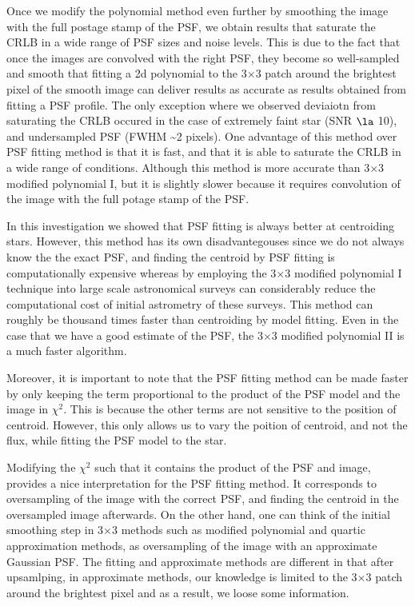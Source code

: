 \documentclass[12pt, preprint]{aastex}
\begin{document}
Once we modify the polynomial method even further by smoothing the image with the full postage stamp
of the PSF, we obtain results that saturate the CRLB in a wide range of PSF sizes and noise levels.  
This is due to the fact that once the images are convolved with the right PSF, they become so well-sampled and smooth
that fitting a 2d polynomial to the 3$\times$3 patch around the brightest pixel of the smooth image can deliver
results as accurate as results obtained from fitting a PSF profile. The only exception where we observed deviaiotn from
saturating the CRLB occured in the case of extremely faint star (SNR $\la$ 10), and undersampled PSF (FWHM \sim 2 pixels).
One advantage of this method over PSF fitting method is that it is fast, and that it is able to saturate the CRLB in 
a wide range of conditions. Although this method is more accurate than 3$\times$3 modified polynomial I, but it is
slightly slower because it requires convolution of the image with the full potage stamp of the PSF. 

In this investigation we showed that PSF fitting is always better at centroiding stars.
However, this method has its own disadvantegouses since we do not always know the the exact PSF, and 
finding the centroid by PSF fitting is computationally expensive whereas by employing the 3$\times$3 modified polynomial I
technique into large scale astronomical surveys can considerably reduce the computational cost
of initial astrometry of these surveys. This method can roughly be thousand
times faster than centroiding by model fitting. Even in the case that we have a good estimate of the PSF, the 
3$\times$3 modified polynomial II is a much faster algorithm.

Moreover, it is important to note that the PSF fitting method can be made faster by only keeping the 
term proportional to the product of the PSF model and the image in $\chi^2$. This is because 
the other terms are not sensitive to the position of centroid. However, this only allows
us to vary the poition of centroid, and not the flux, while fitting the PSF model
to the star. 

Modifying the $\chi^2$ such that it contains the product of the PSF and image, 
provides a nice interpretation for the PSF fitting method. It corresponds to oversampling
of the image with the correct PSF, and finding the centroid in the oversampled image afterwards.
On the other hand, one can think of the initial smoothing step in 3$\times$3 methods
such as modified polynomial and quartic approximation methods, as oversampling of the 
image with an approximate Gaussian PSF. The fitting and approximate methods are different 
in that after upsamlping, in approximate methods, our knowledge is limited to the 3$\times$3 
patch around the brightest pixel and as a result, we loose some information.
\end{document}
